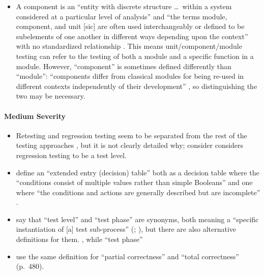 \begin{itemize}
\begin{itemize}
            \end{itemize}
      \item A component is an ``entity with discrete structure \dots\ within a
            system considered at a particular level of analysis''
            \citep{ISO_IEC2023b} and ``the terms module, component, and unit
                  [sic] are often used interchangeably or defined to be subelements
            of one another in different ways depending upon the context'' with
            no standardized relationship \citep[p.~82]{IEEE2017}. This means
            unit/component/module testing can refer to the testing of both a
            module and a specific function in a module.
            However, ``component'' is sometimes defined differently than
            ``module'': ``components differ from classical modules for being
            re-used in different contexts independently of their development''
            \citep[p.~107]{BaresiAndPezzè2006}, so distinguishing the two
            may be necessary.
            \ifnotpaper
\end{itemize}

\paragraph{Medium Severity}
\begin{itemize}\fi
      \item Retesting and regression testing seem to be separated from the rest
            of the testing approaches \citep[p.~23]{IEEE2022}, but it is not
            clearly detailed why; \citet[p.~3]{BarbosaEtAl2006} \ifnotpaper
                  consider \else considers \fi regression testing to be a test level.
            \ifnotpaper
      \item \citeauthor{IEEE2021} define an ``extended entry (decision) table''
            both as a decision table where the ``conditions consist of multiple
            values rather than simple Booleans'' \citeyearpar[p.~18]{IEEE2021}
            and one where ``the conditions and actions are generally described
            but are incomplete'' \citeyearpar[p.~175]{IEEE2017}.
      \item \citeauthor*{IEEE2017} say that ``test level'' and ``test phase''
            are synonyms, both meaning a ``specific instantiation of [a] test
            sub-process'' (\citeyear[pp.~469,~470]{IEEE2017};
            \citeyear[p.~9]{IEEE2013}), but there are also alternative
            definitions for them. \procLevel{\citeyearpar}, while
            ``test phase'' \phaseDef{}
      \item \citeauthor{IEEE2017} use the same definition for ``partial correctness''
            \citeyearpar[p.~314]{IEEE2017} and ``total correctness'' (p.~480).
            \fi
\end{itemize}

